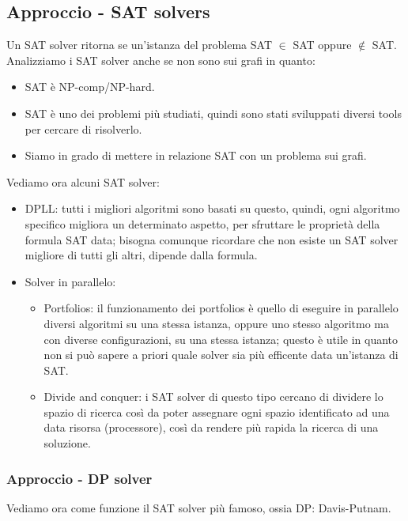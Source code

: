\documentclass[12pt,a4paper]{article}
\begin{document}
\subsection{Approccio - SAT solvers}
Un SAT solver ritorna se un'istanza del problema SAT $\in$ SAT oppure $\notin$ SAT. Analizziamo i SAT solver anche se non sono sui grafi in quanto:
\begin{itemize}
\item SAT è NP-comp/NP-hard.
\item SAT è uno dei problemi più studiati, quindi sono stati sviluppati diversi tools per cercare di risolverlo.
\item Siamo in grado di mettere in relazione SAT con un problema sui grafi.
\end{itemize}
Vediamo ora alcuni SAT solver:
\begin{itemize}
\item DPLL: tutti i migliori algoritmi sono basati su questo, quindi, ogni algoritmo specifico migliora un determinato aspetto, per sfruttare le proprietà della formula SAT data; bisogna comunque ricordare che non esiste un SAT solver migliore di tutti gli altri, dipende dalla formula.
\item Solver in parallelo:
\begin{itemize}
\item Portfolios: il funzionamento dei portfolios è quello di eseguire in parallelo diversi algoritmi su una stessa istanza, oppure uno stesso algoritmo ma con diverse configurazioni, su una stessa istanza; questo è utile in quanto non si può sapere a priori quale solver sia più efficente data un'istanza di SAT.
\item Divide and conquer: i SAT solver di questo tipo cercano di dividere lo spazio di ricerca così da poter assegnare ogni spazio identificato ad una data risorsa (processore), così da rendere più rapida la ricerca di una soluzione.
\end{itemize}
\end{itemize}

\subsubsection{Approccio - DP solver}
Vediamo ora come funzione il SAT solver più famoso, ossia DP: Davis-Putnam.
\end{document}
